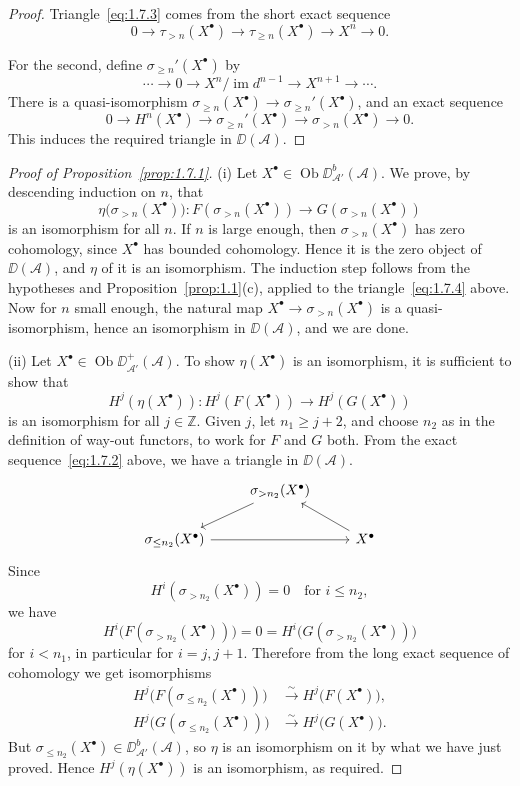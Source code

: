 \begin{proof}
Triangle~\eqref{eq:1.7.3} comes from the short exact sequence
\[
0\to\tau_{>n}(X^\bullet)\to\tau_{\ge n}(X^\bullet)\to X^n\to 0.
\]

For the second, define
$\sigma_{\ge n}'(X^\bullet)$ by
\[
\cdots\to 0\to X^n/\operatorname{im}d^{n-1}\to X^{n+1}\to\cdots.
\]
There is a quasi-isomorphism $\sigma_{\ge n}(X^\bullet)\to\sigma_{\ge n}'(X^\bullet)$,
and an exact sequence
\[
0\to H^n(X^\bullet)\to\sigma_{\ge n}'(X^\bullet)\to\sigma_{>n}(X^\bullet)\to 0.
\]
This induces the required triangle in $\DD(\mathcal{A})$.
\end{proof}

\begin{proof}[Proof of Proposition~\ref{prop:1.7.1}]
(i) Let $X^\bullet\in\operatorname{Ob}\DD_{\mathcal{A}'}^b(\mathcal{A})$. We prove, by descending induction on $n$, that
\[
\eta\big(\sigma_{>n}(X^\bullet)\big): F(\sigma_{>n}(X^\bullet))\to G(\sigma_{>n}(X^\bullet))
\]
is an isomorphism for all $n$. If $n$ is large enough, then $\sigma_{>n}(X^\bullet)$ has zero cohomology, since $X^\bullet$ has bounded cohomology. Hence it is the zero object of $\DD(\mathcal{A})$, and $\eta$ of it is an isomorphism. The induction step follows from the hypotheses and Proposition~\ref{prop:1.1}(c), applied to the triangle~\eqref{eq:1.7.4} above. Now for $n$ small enough, the natural map $X^\bullet\to\sigma_{>n}(X^\bullet)$ is a quasi-isomorphism, hence an isomorphism in $\DD(\mathcal{A})$, and we are done.

(ii) Let $X^\bullet\in\operatorname{Ob}\DD_{\mathcal{A}'}^+(\mathcal{A})$. To show $\eta(X^\bullet)$ is an isomorphism, it is sufficient to show that
\[
H^j(\eta(X^\bullet)): H^j(F(X^\bullet))\to H^j(G(X^\bullet))
\]
is an isomorphism for all $j\in\mathbb{Z}$. Given $j$, let $n_1\ge j+2$, and choose $n_2$ as in the definition of way-out functors, to work for $F$ and $G$ both. From the exact sequence~\eqref{eq:1.7.2} above, we have a triangle in $\DD(\mathcal{A})$.
\[
\begin{tikzcd}
	& \sigma_{>n_2}(X^\bullet) \arrow[ld] & \\
	\sigma_{\le n_2}(X^\bullet) \arrow[rr] & & X^\bullet\arrow[lu]
\end{tikzcd}
\]
 Since
\[
H^i(\sigma_{>n_2}(X^\bullet))=0 \quad\text{for } i\le n_2,
\]
we have
\[
H^i\big(F(\sigma_{>n_2}(X^\bullet))\big) = 0 = H^i\big(G(\sigma_{>n_2}(X^\bullet))\big)
\]
for $i<n_1$, in particular for $i=j,j+1$. Therefore from the long exact sequence of cohomology we get isomorphisms
\begin{align*}
H^j\big(F(\sigma_{\le n_2}(X^\bullet))\big) &\stackrel{\sim}{\longrightarrow} H^j\big(F(X^\bullet)\big),\\
H^j\big(G(\sigma_{\le n_2}(X^\bullet))\big) &\stackrel{\sim}{\longrightarrow} H^j\big(G(X^\bullet)\big).
\end{align*}
But $\sigma_{\le n_2}(X^\bullet)\in\DD_{\mathcal{A}'}^b(\mathcal{A})$, so $\eta$ is an isomorphism on it by what we have just proved. Hence $H^j(\eta(X^\bullet))$ is an isomorphism, as required.


\end{proof}
